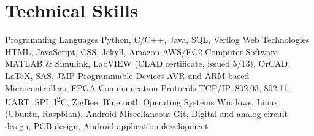 \section{Technical Skills}
\begin{cvskills}
  \cvskill
    {Programming Languages}
    {Python, C/C++, Java, SQL, Verilog}
  \cvskill
    {Web Technologies}
    {HTML, JavaScript, CSS, Jekyll, Amazon AWS/EC2}
  \cvskill
    {Computer Software}
    {MATLAB \& Simulink, LabVIEW (CLAD certificate, issued 5/13), OrCAD, \LaTeX, SAS, JMP}
  \cvskill
    {Programmable Devices}
    {AVR and ARM-based Microcontrollers, FPGA}
  \cvskill
    {Communication Protocols}
    {TCP/IP, 802.03, 802.11, UART, SPI, I\textsuperscript{2}C, ZigBee, Bluetooth}
  \cvskill
    {Operating Systems}
    {Windows, Linux (Ubuntu, Raspbian), Android}
  \cvskill
    {Miscellaneous}
    {Git, Digital and analog circuit design, PCB design, Android application development}
\end{cvskills} 